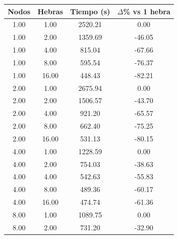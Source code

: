 \begin{table}[ht]
    \centering
    \begin{tabular}{|c|c|c|c|}
        \hline
        \textbf{Nodos} & \textbf{Hebras} & \textbf{Tiempo (s)} & \textbf{$\Delta$\% vs 1 hebra} \\
        \hline
        1.00           & 1.00            & 2520.21             & 0.00                           \\
        1.00           & 2.00            & 1359.69             & -46.05                         \\
        1.00           & 4.00            & 815.04              & -67.66                         \\
        1.00           & 8.00            & 595.54              & -76.37                         \\
        1.00           & 16.00           & 448.43              & -82.21                         \\
        2.00           & 1.00            & 2675.94             & 0.00                           \\
        2.00           & 2.00            & 1506.57             & -43.70                         \\
        2.00           & 4.00            & 921.20              & -65.57                         \\
        2.00           & 8.00            & 662.40              & -75.25                         \\
        2.00           & 16.00           & 531.13              & -80.15                         \\
        4.00           & 1.00            & 1228.59             & 0.00                           \\
        4.00           & 2.00            & 754.03              & -38.63                         \\
        4.00           & 4.00            & 542.63              & -55.83                         \\
        4.00           & 8.00            & 489.36              & -60.17                         \\
        4.00           & 16.00           & 474.74              & -61.36                         \\
        8.00           & 1.00            & 1089.75             & 0.00                           \\
        8.00           & 2.00            & 731.20              & -32.90                         \\

\end{tabular}
\end{table}
